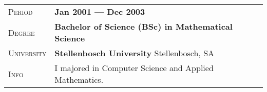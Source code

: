 \documentclass[a4paper, oneside, final]{scrartcl} %
\newcommand{\gray}{\rowcolor[gray]{.90}} %
\newcommand{\subSecHeadWidth}{2.1cm}
\begin{document}
\begin{center}
\vspace{12pt}

\begin{tabularx}{0.97\linewidth}{>{\raggedleft\scshape}p{\subSecHeadWidth}X}
\gray Period & \textbf{Jan 2001 --- Dec 2003}\\
\gray Degree & \textbf{Bachelor of Science (BSc) in Mathematical Science}\\
\gray University & \textbf{Stellenbosch University} \hfill Stellenbosch, SA\\
Info & I majored in Computer Science and Applied Mathematics.
\end{tabularx}



\end{center}
\end{document}
